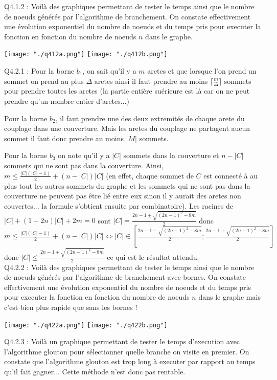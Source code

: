 \documentclass[a4paper]{article}
\begin{document}
Q4.1.2 :
Voilà des graphiques permettant de tester le temps ainsi que le nombre de noeuds générés par l'algorithme de branchement. On constate effectivement une évolution exponentiel du nombre de noeuds et du temps pris pour executer la fonction en fonction du nombre de noeuds $n$ dans le graphe.

\texttt{[image: "./q412a.png"]}
\texttt{[image: "./q412b.png"]}

Q4.2.1 : Pour la borne $b_1$, on sait qu'il y a $m$ aretes et que lorsque l'on prend un sommet on prend au plus $\Delta$ aretes ainsi il faut prendre au moins $ \lceil \frac{m}{\Delta} \rceil $ sommets pour prendre toutes les aretes (la partie entière suérieure est là car on ne peut prendre qu'un nombre entier d'aretes...)

Pour la borne $b_2$, il faut prendre une des deux extremités de chaque arete du couplage dans une couverture. Mais les aretes du couplage ne partagent aucun sommet il faut donc prendre au moins $|M|$ sommets.

Pour la borne $b_3$ on note qu'il y a $|C|$ sommets dans la couverture et $n-|C|$ sommets qui ne sont pas dans la couverture. Ainsi,  $m \leq \frac{|C|(|C|-1)}{2} + (n-|C|)|C|$ (en effet, chaque sommet de $C$ est connecté à au plus tout les autres sommets du graphe et les sommets qui ne sont pas dans la couverture ne peuvent pas être lié entre eux sinon il y aurait des aretes non couvertes... la formule s'obtient ensuite par combinatoire). Les racines de $|C| + (1-2n)|C| + 2m = 0$ sont $|C| = \frac{2n - 1 \pm \sqrt{(2n-1)^2 - 8m}}{2}$ donc $m \leq \frac{|C|(|C|-1)}{2} + (n-|C|)|C| \iff |C| \in [\frac{2n - 1 - \sqrt{(2n-1)^2 - 8m}}{2};\frac{2n - 1 + \sqrt{(2n-1)^2 - 8m}}{2}]$ donc $|C| \leq \frac{2n - 1 + \sqrt{(2n-1)^2 - 8m}}{2}$ ce qui est le résultat attendu. \\

Q4.2.2 : 
Voilà des graphiques permettant de tester le temps ainsi que le nombre de noeuds générés par l'algorithme de branchement avec bornes. On constate effectivement une évolution exponentiel du nombre de noeuds et du temps pris pour executer la fonction en fonction du nombre de noeuds $n$ dans le graphe mais c'est bien plus rapide que sans les bornes !

\texttt{[image: "./q422a.png"]}
\texttt{[image: "./q422b.png"]}

Q4.2.3 : 
Voilà un graphique permettant de tester le temps d'execution avec l'algorithme glouton pour sélectionner quelle branche on visite en premier. On constate que l'algorithme glouton est trop long à executer par rapport au temps qu'il fait gagner... Cette méthode n'est donc pas rentable.
\end{document}
